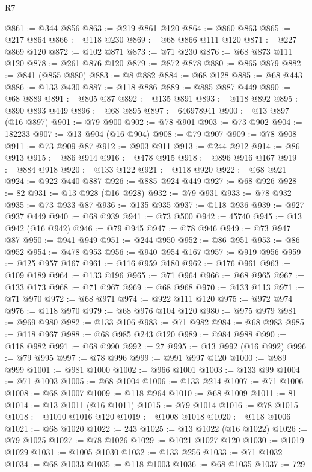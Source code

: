 \begin{lexlean}{R7}
\begin{coremodule}
@861 := @344 @856
@863 := @219 @861 @120
@864 := @860 @863
@865 := @217 @864
@866 := @118 @230
@869 := @68 @866 @111 @120
@871 := @227 @869 @120
@872 := @102 @871
@873 := @71 @230
@876 := @68 @873 @111 @120
@878 := @261 @876 @120
@879 := @872 @878
@880 := @865 @879
@882 := @841 (@855 @880)
@883 := @8 @882
@884 := @68 @128
@885 := @68 @443
@886 := @133 @430
@887 := @118 @886
@889 := @885 @887 @449
@890 := @68 @889
@891 := @805 @87
@892 := @135 @891
@893 := @118 @892
@895 := @890 @893 @449
@896 := @68 @895
@897 := 646978941
@900 := @13 @897 (@16 @897)
@901 := @79 @900
@902 := @78 @901
@903 := @73 @902
@904 := 182233
@907 := @13 @904 (@16 @904)
@908 := @79 @907
@909 := @78 @908
@911 := @73 @909 @87
@912 := @903 @911
@913 := @244 @912
@914 := @86 @913
@915 := @86 @914
@916 := @478 @915
@918 := @896 @916 @167
@919 := @884 @918
@920 := @133 @122
@921 := @118 @920
@922 := @68 @921
@924 := @922 @440 @887
@926 := @885 @924 @449
@927 := @68 @926
@928 := 82
@931 := @13 @928 (@16 @928)
@932 := @79 @931
@933 := @78 @932
@935 := @73 @933 @87
@936 := @135 @935
@937 := @118 @936
@939 := @927 @937 @449
@940 := @68 @939
@941 := @73 @500
@942 := 45740
@945 := @13 @942 (@16 @942)
@946 := @79 @945
@947 := @78 @946
@949 := @73 @947 @87
@950 := @941 @949
@951 := @244 @950
@952 := @86 @951
@953 := @86 @952
@954 := @478 @953
@956 := @940 @954 @167
@957 := @919 @956
@959 := @125 @957 @167
@961 := @116 @959 @180
@962 := @176 @961
@963 := @109 @189
@964 := @133 @196
@965 := @71 @964
@966 := @68 @965
@967 := @133 @173
@968 := @71 @967
@969 := @68 @968
@970 := @133 @113
@971 := @71 @970
@972 := @68 @971
@974 := @922 @111 @120
@975 := @972 @974
@976 := @118 @970
@979 := @68 @976 @104 @120
@980 := @975 @979
@981 := @969 @980
@982 := @133 @106
@983 := @71 @982
@984 := @68 @983
@985 := @118 @967
@988 := @68 @985 @243 @120
@989 := @984 @988
@990 := @118 @982
@991 := @68 @990
@992 := 27
@995 := @13 @992 (@16 @992)
@996 := @79 @995
@997 := @78 @996
@999 := @991 @997 @120
@1000 := @989 @999
@1001 := @981 @1000
@1002 := @966 @1001
@1003 := @133 @99
@1004 := @71 @1003
@1005 := @68 @1004
@1006 := @133 @214
@1007 := @71 @1006
@1008 := @68 @1007
@1009 := @118 @964
@1010 := @68 @1009
@1011 := 81
@1014 := @13 @1011 (@16 @1011)
@1015 := @79 @1014
@1016 := @78 @1015
@1018 := @1010 @1016 @120
@1019 := @1008 @1018
@1020 := @118 @1006
@1021 := @68 @1020
@1022 := 243
@1025 := @13 @1022 (@16 @1022)
@1026 := @79 @1025
@1027 := @78 @1026
@1029 := @1021 @1027 @120
@1030 := @1019 @1029
@1031 := @1005 @1030
@1032 := @133 @256
@1033 := @71 @1032
@1034 := @68 @1033
@1035 := @118 @1003
@1036 := @68 @1035
@1037 := 729

\end{coremodule}
\end{lexlean}
